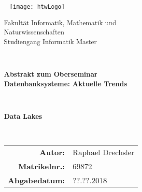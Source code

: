 \documentclass[
10pt, %
a4paper, %
oneside, %
headinclude,footinclude, %
BCOR5mm, %
]{scrartcl}
\begin{document}
{ \centering
{ \par}\
 \linebreak
\linebreak 
\linebreak
\linebreak
\linebreak
\texttt{[image: htwLogo]} 
\linebreak
\linebreak
\linebreak
\linebreak 
{\fontsize{14}{16}\selectfont \center Fakultät Informatik, Mathematik und\\Naturwissenschaften\\Studiengang Informatik Master\par}\
 \linebreak
{\fontsize{18}{20}\selectfont \center \textbf{Abstrakt zum Oberseminar\\Datenbanksysteme: Aktuelle Trends}\par}\
{\fontsize{20}{22}\selectfont \center \textbf{Data Lakes} \par}\
\linebreak
\linebreak
\linebreak
\linebreak 
\linebreak
\linebreak 
\linebreak 
{\fontsize{14}{16}\selectfont  \begin{tabular}{rl}
 	\textbf{Autor:} & Raphael Drechsler\\ 
 	\textbf{Matrikelnr.:} &  69872\\ 
 	\textbf{Abgabedatum:} & ??.??.2018 \\ 
 \end{tabular}
\par}
\par}
\pagebreak
\setcounter{tocdepth}{2} %

\end{document}
